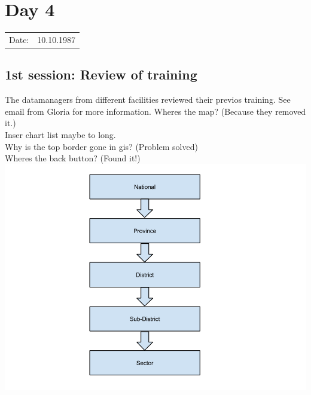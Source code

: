 \section{Day 4}
\begin{tabular}{|c|c|}
Date: & 10.10.1987 \\
\end{tabular}
\subsection{1st session: Review of training}
The datamanagers from different facilities reviewed their previos training. See email from Gloria for more information.
Wheres the map? (Because they removed it.)\\
Inser chart list maybe to long.\\
Why is the top border gone in gis? (Problem solved)\\
Wheres the back button? (Found it!)\\
\includegraphics[width=15cm]{appendix/images/dhis2_map_categories}
